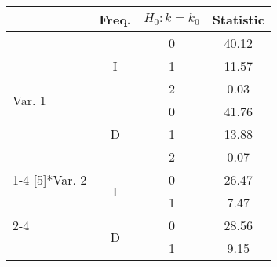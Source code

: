 \documentclass[a4paper,12pt]{article}
\begin{document}
	\newcommand{\Title}{Title of Table}
	\begin{footnotesize}
		\begin{table}[tbph]
			\centering
			\iftoggle{longnotes}{ \caption{\Title} }{ \caption*{\Title} } \label{tab:extabltx}
			\begin{threeparttable}
				\begin{tabular}{lccc}
					\toprule
					& Freq. & \(H_{0}: k = k_{0}\) & Statistic \\
					\midrule
					\multirow{6}[5]{*}{Var. 1} & \multirow{3}{*}{I} & 0 & 40.12 \\
					& & 1 & 11.57 \\
					& & 2 &  0.03 \\
					\cmidrule(lr){2-4}
					& \multirow{3}{*}{D} & 0 & 41.76 \\
					& & 1 & 13.88 \\
					& & 2 &  0.07 \\
					\cmidrule(lr){1-4}
					\multirow{4}[5]{*}{Var. 2} & \multirow{2}{*}{I} & 0 & 26.47 \\
					& & 1 &  7.47 \\
					\cmidrule(lr){2-4}
					& \multirow{2}{*}{D} & 0 & 28.56 \\
					& & 1 &  9.15 \\
					\bottomrule
				\end{tabular}
			\end{threeparttable}
		\end{table}
	\end{footnotesize}
\end{document}
